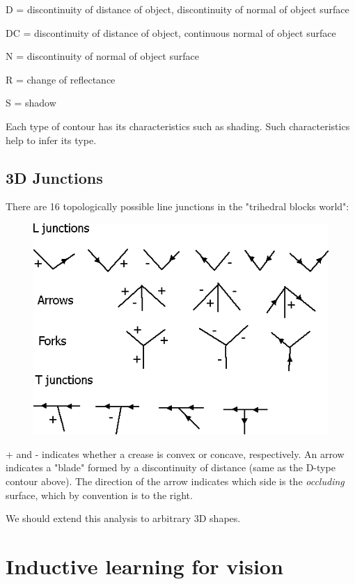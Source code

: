 D = discontinuity of distance of object, discontinuity of normal of object surface

DC = discontinuity of distance of object, continuous normal of object surface

N = discontinuity of normal of object surface 

R = change of reflectance

S = shadow

Each type of contour has its characteristics such as shading. Such characteristics help to infer its type.

\subsection{3D Junctions }

There are 16 topologically possible line junctions in the "trihedral blocks world":

\begin{figure}[H]
\centering
\includegraphics[scale=0.7]{16Junctions.PNG}
\end{figure}

+ and - indicates whether a crease is convex or concave, respectively. An arrow indicates a "blade" formed by a discontinuity of distance (same as the D-type contour above). The direction of the arrow indicates which side is the \emph{occluding} surface, which by convention is to the right.

We should extend this analysis to arbitrary 3D shapes.

\section{Inductive learning for vision}

